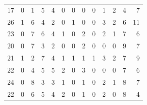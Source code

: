 \begin{table}[]
\begin{tabular}{rrrrrrrrrrrrr}
		17 & 0 & 1 & 5 & 4 & 0 & 0 & 0 & 0 & 1 & 2 & 4 & 7 \\
		26 & 1 & 6 & 4 & 2 & 0 & 1 & 0 & 0 & 3 & 2 & 6 & 11 \\
		23 & 0 & 7 & 6 & 4 & 1 & 0 & 2 & 0 & 2 & 1 & 7 & 6 \\
		20 & 0 & 7 & 3 & 2 & 0 & 0 & 2 & 0 & 0 & 0 & 9 & 7 \\
		21 & 1 & 2 & 7 & 4 & 1 & 1 & 1 & 1 & 3 & 2 & 7 & 9 \\
		22 & 0 & 4 & 5 & 5 & 2 & 0 & 3 & 0 & 0 & 0 & 7 & 6 \\
		24 & 0 & 8 & 3 & 3 & 1 & 0 & 1 & 0 & 2 & 1 & 8 & 7 \\
		22 & 0 & 6 & 5 & 4 & 2 & 0 & 1 & 0 & 2 & 0 & 8 & 4
	\end{tabular}
\end{table}

